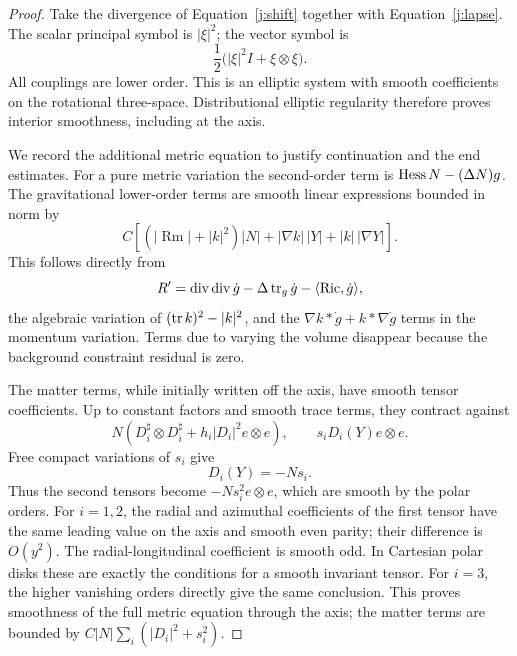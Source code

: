 \begin{proof}
Take the divergence of Equation~\eqref{j:shift} together with
Equation~\eqref{j:lapse}. The scalar principal symbol is \(|\xi|^2\);
the vector symbol is
\[
 \frac12\bigl(|\xi|^2I+\xi\otimes\xi\bigr).
\]
All couplings are lower order. This is an elliptic system with smooth
coefficients on the rotational three-space. Distributional elliptic
regularity therefore proves interior smoothness, including at the axis.

We record the additional metric equation to justify continuation and the
end estimates. For a pure metric variation the second-order term is
\(\operatorname{Hess} N-(\Delta N)g\). The gravitational lower-order terms are smooth
linear expressions bounded in norm by
\begin{equation}
\label{j:gravitational-coefficients}
 C\left[(|\operatorname{Rm}|+|k|^2)|N|
             +|\nabla k|\,|Y|+|k|\,|\nabla Y|\right].
\end{equation}
This follows directly from
\[
 R'=\operatorname{div}\operatorname{div}\dot g-\Delta\operatorname{tr}_g\dot g-\langle\operatorname{Ric},\dot g\rangle,
\]
the algebraic variation of \((\operatorname{tr} k)^2-|k|^2\), and the
\(\nabla k*\dot g+k*\nabla\dot g\) terms in the momentum variation.
Terms due to varying the volume disappear because the background
constraint residual is zero.

The matter terms, while initially written off the axis, have smooth
tensor coefficients. Up to constant factors and smooth trace terms,
they contract against
\begin{equation}
\label{j:matter-coefficients}
 N\left(D_i^\sharp\otimes D_i^\sharp+
                      h_i|D_i|^2e\otimes e\right),
       \qquad s_iD_i(Y)e\otimes e.
\end{equation}
Free compact variations of \(s_i\) give
\begin{equation}
\label{j:map-velocity}
 D_i(Y)=-Ns_i.
\end{equation}
Thus the second tensors become \(-Ns_i^2e\otimes e\), which are
smooth by the polar orders. For \(i=1,2\), the radial and azimuthal
coefficients of the first tensor have the same leading value on the axis
and smooth even parity; their difference is \(O(y^2)\). The
radial-longitudinal coefficient is smooth odd. In Cartesian polar disks
these are exactly the conditions for a smooth invariant tensor.
For \(i=3\), the higher vanishing orders directly give the same conclusion.
This proves smoothness of the full metric equation through the axis; the
matter terms are bounded by
\(C|N|\sum_i(|D_i|^2+s_i^2)\).


\end{proof}
